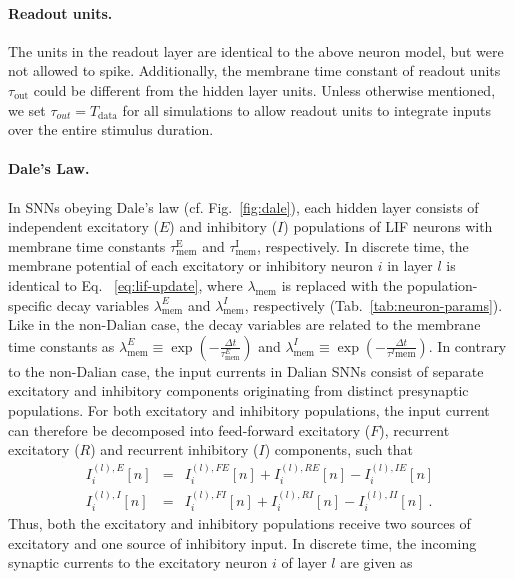 \documentclass[11pt,a4paper]{article}
\begin{document}
\paragraph{Readout units.} 
The units in the readout layer are identical to the above neuron model, but were not allowed to spike. 
Additionally, the membrane time constant of readout units $\tau_{\text{out}}$ could be different from the hidden layer units. 
Unless otherwise mentioned, we set $\tau_{out}= T_{\text{data}}$ for all simulations to allow readout units to integrate inputs over the entire stimulus duration. 

\paragraph{Dale's Law.}
In \acp{SNN} obeying Dale's law (cf. Fig.~\ref{fig:dale}), each hidden layer consists of independent excitatory ($E$) and inhibitory ($I$) populations of \ac{LIF} neurons with membrane time constants $\tau_{\text{mem}}^{\text{E}}$ and $\tau_{\text{mem}}^{\text{I}}$, respectively. 
In discrete time, the membrane potential of each excitatory or inhibitory neuron $i$ in layer $l$ is identical to Eq. ~\eqref{eq:lif-update}, where $\lambda_\text{mem}$ is replaced with the population-specific decay variables $\lambda_\text{mem}^E$ and $\lambda_\text{mem}^I$, respectively (Tab.~\ref{tab:neuron-params}).
Like in the non-Dalian case, the decay variables are related to the membrane time constants as $\lambda^{E}_{\text{mem}} \equiv \exp \left(-\frac{\Delta t}{\tau^E_{\text{mem}}}\right)$ and $\lambda^{I}_{\text{mem}} \equiv \exp \left(-\frac{\Delta t}{\tau^I{\text{mem}}}\right)$.
In contrary to the non-Dalian case, the input currents in Dalian \acp{SNN} consist of separate excitatory and inhibitory components originating from distinct presynaptic populations.
For both excitatory and inhibitory populations, the input current can therefore be decomposed into feed-forward excitatory ($F$), recurrent excitatory ($R$) and recurrent inhibitory ($I$) components, such that
\begin{eqnarray}
I^{(l), E}_i[n] &=& I^{(l), FE}_i[n] + I^{(l), RE}_i[n] - I^{(l), IE}_i[n] \\
I^{(l), I}_i[n] &=& I^{(l), FI}_i[n] + I^{(l), RI}_i[n] - I^{(l), II}_i[n] ~.
\end{eqnarray}
Thus, both the excitatory and inhibitory populations receive two sources of excitatory and one source of inhibitory input. In discrete time, the incoming synaptic currents to the excitatory neuron $i$ of layer $l$ are given as
\end{document}
